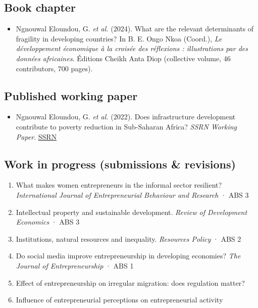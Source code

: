\documentclass[
  french,
  10pt,
  letterpaper,
  DIV=11,
  numbers=noendperiod]{scrartcl}
\providecommand{\tightlist}{%
  \setlength{\itemsep}{0pt}\setlength{\parskip}{0pt}}
\begin{document}
\subsection{Book chapter}\label{book-chapter}

\begin{itemize}
\tightlist
\item
  Ngnouwal Eloundou, G. \textit{et al.} (2024). What are the relevant
  determinants of fragility in developing countries? In B. E. Ongo Nkoa
  (Coord.),
  \textit{Le développement économique à la croisée des réflexions : illustrations par des données africaines}.
  Éditions Cheikh Anta Diop (collective volume, 46 contributors, 700
  pages).
\end{itemize}

\subsection{Published working paper}\label{published-working-paper}

\begin{itemize}
\tightlist
\item
  Ngnouwal Eloundou, G. \textit{et al.} (2022). Does infrastructure
  development contribute to poverty reduction in Sub-Saharan Africa?
  \textit{SSRN Working Paper}.
  \href{https://ssrn.com/abstract=4397985}{SSRN}
\end{itemize}

\subsection{Work in progress (submissions \&
revisions)}\label{work-in-progress-submissions-revisions}

\begin{enumerate}[leftmargin=1.6em, itemsep=2pt]
\item What makes women entrepreneurs in the informal sector resilient? \textit{International Journal of Entrepreneurial Behaviour and Research} · ABS 3
\item Intellectual property and sustainable development. \textit{Review of Development Economics} · ABS 3
\item Institutions, natural resources and inequality. \textit{Resources Policy} · ABS 2
\item Do social media improve entrepreneurship in developing economies? \textit{The Journal of Entrepreneurship} · ABS 1
\item Effect of entrepreneurship on irregular migration: does regulation matter?
\item Influence of entrepreneurial perceptions on entrepreneurial activity
\end{enumerate}
\end{document}
